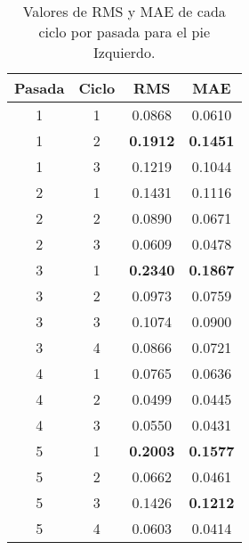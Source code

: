 \begin{table}[H]
\centering
\renewcommand{\arraystretch}{1.2}
\begin{tabular}{|c|c|c|c|}
\hline
\textbf{Pasada} & \textbf{Ciclo} & \textbf{RMS} & \textbf{MAE} \\
\hline
1 & 1 & 0.0868 & 0.0610 \\
\hline
1 & 2 & \textbf{0.1912} & \textbf{0.1451} \\
\hline
1 & 3 & 0.1219 & 0.1044 \\
\hline
2 & 1 & 0.1431 & 0.1116 \\
\hline
2 & 2 & 0.0890 & 0.0671 \\
\hline
2 & 3 & 0.0609 & 0.0478 \\
\hline
3 & 1 & \textbf{0.2340} & \textbf{0.1867} \\
\hline
3 & 2 & 0.0973 & 0.0759 \\
\hline
3 & 3 & 0.1074 & 0.0900 \\
\hline
3 & 4 & 0.0866 & 0.0721 \\
\hline
4 & 1 & 0.0765 & 0.0636 \\
\hline
4 & 2 & 0.0499 & 0.0445 \\
\hline
4 & 3 & 0.0550 & 0.0431 \\
\hline
5 & 1 & \textbf{0.2003} & \textbf{0.1577} \\
\hline
5 & 2 & 0.0662 & 0.0461 \\
\hline
5 & 3 & 0.1426 & \textbf{0.1212} \\
\hline
5 & 4 & 0.0603 & 0.0414 \\
\hline
\end{tabular}
\caption{Valores de RMS y MAE de cada ciclo por pasada para el pie Izquierdo.}
\label{tab:rms_mae_pie_izquierdo}
\end{table}
